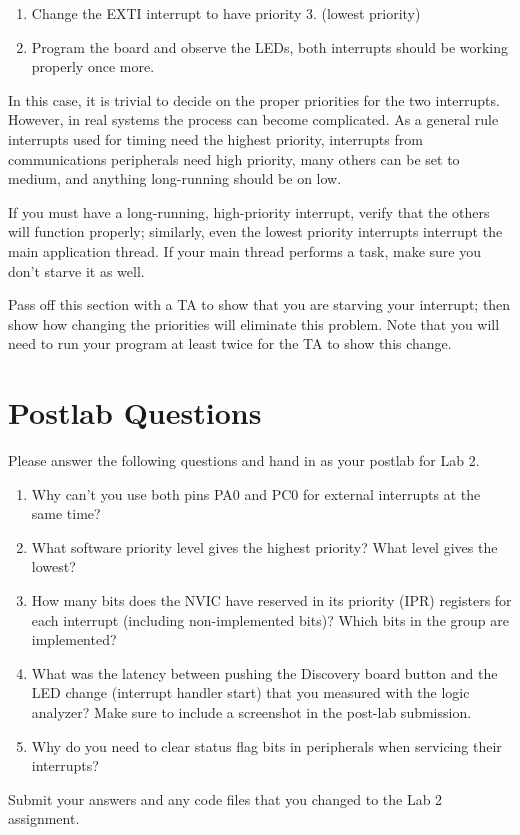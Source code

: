\documentclass[openany,11pt,fleqn]{book} %
\begin{document}
\begin{exercise}
    \begin{enumerate}
        \item Change the EXTI interrupt to have priority 3. (lowest priority)
        \item Program the board and observe the LEDs, both interrupts should be working properly once more.
    \end{enumerate}
    
    In this case, it is trivial to decide on the proper priorities for the two interrupts. However, in real systems the process can become complicated. As a general rule interrupts used for timing need the highest priority, interrupts from communications peripherals need high priority, many others can be set to medium, and anything long-running should be on low. 
    
    If you must have a long-running, high-priority interrupt, verify that the others will function properly; similarly, even the lowest priority interrupts interrupt the main application thread. If your main thread performs a task, make sure you don't starve it as well.
    
\end{exercise}

\begin{assignment}
	Pass off this section with a TA to show that you are starving your interrupt; then show how changing the priorities will eliminate this problem. Note that you will need to run your program at least twice for the TA to show this change.
\end{assignment}

\section{\color{blue}Postlab Questions}
\begin{question}[Postlab 2]
	Please answer the following questions and hand in as your postlab for Lab 2.
	\begin{enumerate}
		\item Why can't you use both pins PA0 and PC0 for external interrupts at the same time?
		\item What software priority level gives the highest priority? What level gives the lowest?
		\item How many bits does the NVIC have reserved in its priority (IPR) registers for each interrupt (including non-implemented bits)?
		Which bits in the group are implemented?
		\item What was the latency between pushing the Discovery board button and the LED change (interrupt handler start) that you measured with the logic analyzer?
		Make sure to include a screenshot in the post-lab submission.
		\item Why do you need to clear status flag bits in peripherals when servicing their interrupts?
	\end{enumerate}
	Submit your answers and any code files that you changed to the Lab 2 assignment.
\end{question}
\end{document}
